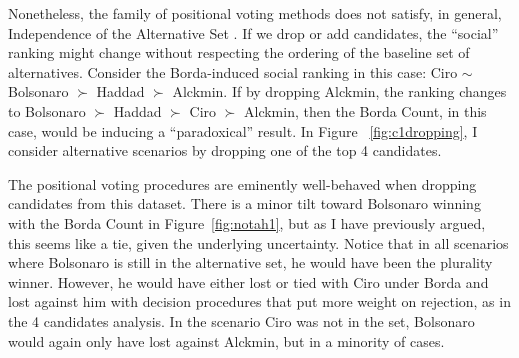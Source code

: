 \documentclass[hidelinks,11pt]{article} \usepackage[utf8]{inputenc}
\begin{document}
Nonetheless, the family of positional voting methods does not satisfy, in
general, Independence of the Alternative Set \parencite{kaminski2015empirical}.
If we drop or add candidates, the ``social'' ranking might change without
respecting the ordering of the baseline set of alternatives. Consider the
Borda-induced social ranking in this case: Ciro \( \sim \) Bolsonaro \(\succ\) Haddad \(\succ\)
Alckmin. If by dropping Alckmin, the ranking changes to Bolsonaro \(\succ\) Haddad \(\succ\)
Ciro \(\succ\) Alckmin, then the Borda Count, in this case, would be inducing a
``paradoxical'' result. In Figure ~\ref{fig:c1dropping}, I consider alternative
scenarios by dropping one of the top 4 candidates.

The positional voting procedures are eminently well-behaved when dropping
candidates from this dataset. There is a minor tilt toward Bolsonaro winning
with the Borda Count in Figure~\ref{fig:notah1}, but as I have previously argued, this seems
like a tie, given the underlying uncertainty. Notice that in all scenarios where
Bolsonaro is still in the alternative set, he would have been the plurality
winner. However, he would have either lost or tied with Ciro under Borda and
lost against him with decision procedures that put more weight on rejection, as
in the 4 candidates analysis. In the scenario Ciro was not in the set, Bolsonaro
would again only have lost against Alckmin, but in a minority of cases.
\end{document}
